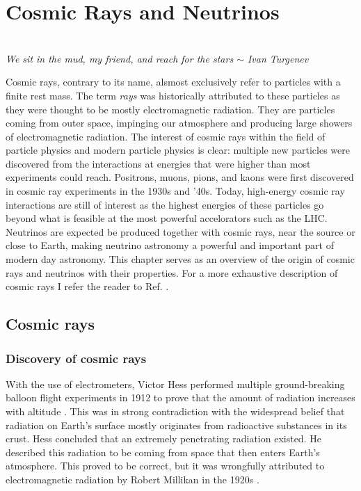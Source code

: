 \chapter{Cosmic Rays and Neutrinos}
\label{ch:cr}
\begin{flushright}
\textit{\\We sit in the mud, my friend, and reach for the stars $\sim$ Ivan Turgenev\\}\end{flushright}


\noindent Cosmic rays, contrary to its name, alsmost exclusively refer to particles with a finite rest mass. The term \textit{rays} was historically attributed to these particles as they were thought to be mostly electromagnetic radiation. They are particles coming from outer space, impinging our atmosphere and producing large showers of electromagnetic radiation.
The interest of cosmic rays within the field of particle physics and modern particle physics is clear: multiple new particles were discovered from the interactions at energies that were higher than most experiments could reach. Positrons, muons, pions, and kaons were first discovered in cosmic ray experiments in the 1930s and '40s. Today, high-energy cosmic ray interactions are still of interest as the highest energies of these particles go beyond what is feasible at the most powerful accelorators such as the LHC. Neutrinos are expected be produced together with cosmic rays, near the source or close to Earth, making neutrino astronomy a powerful and important part of modern day astronomy. This chapter serves as an overview of the origin of cosmic rays and neutrinos with their properties. For a more exhaustive description of cosmic rays I refer the reader to Ref. \cite{Gaisser:2016uoy}.

\section{Cosmic rays}
\subsection{Discovery of cosmic rays}
With the use of electrometers, Victor Hess performed multiple ground-breaking balloon flight experiments in 1912 to prove that the amount of radiation increases with altitude \cite{hessnobel:1936}. This was in strong contradiction with the widespread belief that radiation on Earth's surface mostly originates from radioactive substances in its crust. Hess concluded that an extremely penetrating radiation existed. He described this radiation to be coming from space that then enters Earth's atmosphere. This proved to be correct, but it was wrongfully attributed to electromagnetic radiation by Robert Millikan in the 1920s \cite{PhysRev.32.533}. 

